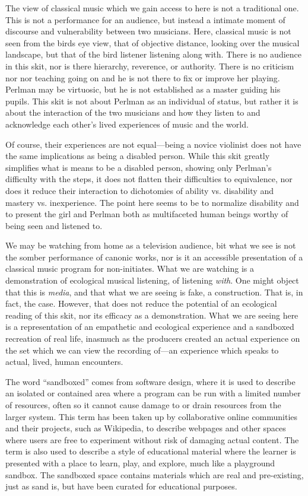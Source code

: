 \documentclass[12pt,letterpaper]{article}
\begin{document}
	The view of classical music which we gain access to here is not a
	traditional one. This is not a performance for an audience, but instead
	a intimate moment of discourse and vulnerability between two 
	musicians. Here, classical music is not seen from the birds eye view,
	that of 
	objective distance, looking over the musical landscape, but that of the 
	bird listener listening along with. There is no audience in this skit, 
	nor is there hierarchy, reverence, or authority. There is no criticism
	nor nor teaching going on and he is not there to fix or improve her
	playing. Perlman may be
	virtuosic, but he is not established as a master guiding his pupils.
	This skit is not about Perlman as an individual of status, but rather
	it is about the interaction of the two musicians and how they listen to 
	and acknowledge each other's lived experiences of music and the world. 

	Of course, their experiences are not equal---being a novice violinist does
	not have the same implications as being a disabled person. While this
	skit greatly simplifies what is means to be a disabled person, showing 
	only Perlman's difficulty with the steps, it does not flatten their 
	difficulties to equivalence, nor does
	it reduce their interaction to dichotomies of ability vs. disability 
	and mastery vs. inexperience. The point here seems to be to normalize
	disability and to present the girl and Perlman both as multifaceted
	 human beings worthy of being seen and listened to. 
	
	We may be watching from home as a television audience, bit what we see
	is not the somber performance of canonic works, nor is it an accessible
	presentation of a classical music program for non-initiates. What we 
	are watching is a demonstration of ecological musical listening, of 
	listening \textit{with}. One might object that this is \textit{media}, 
	and that what we are
	seeing is fake, a construction. That is, in fact, the case. However, 
	that does not reduce the potential of an ecological reading of this 
	skit, nor its efficacy as a demonstration. What we are seeing here is a 
	representation of an empathetic and ecological experience and a 
	sandboxed recreation of real life, inasmuch as the producers created an
	actual experience on the set which we can view the recording of---an 
	experience which speaks to actual, lived, human encounters. 

	The word ``sandboxed'' comes from software design, where it is used
	to describe an isolated or contained area where a program can be run 
	with a limited number of resources, often so it cannot cause damage to
	or drain resources from the larger system. This term has been taken up
	by collaborative online communities and their projects, such as 
	Wikipedia, to describe webpages and other spaces where users are free 
	to experiment without risk of damaging actual 
	content.\autocite{Wiktionary} The term is also used
	to describe a style of educational material where the learner is
	presented with a place to learn, play, and explore, much like a
	playground sandbox. The sandboxed space contains materials which are
	real and pre-existing, just as sand is, but have been curated for 
	educational purposes.
	
\end{document}

